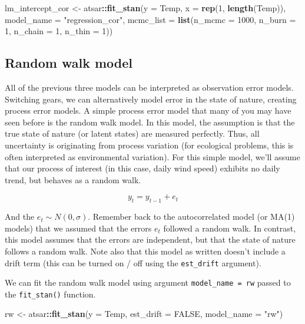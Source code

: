 \documentclass[
]{article}
\newenvironment{Shaded}{\begin{snugshade}}{\end{snugshade}}
\newcommand{\DataTypeTok}[1]{\textcolor[rgb]{0.13,0.29,0.53}{#1}}
\newcommand{\DecValTok}[1]{\textcolor[rgb]{0.00,0.00,0.81}{#1}}
\newcommand{\KeywordTok}[1]{\textcolor[rgb]{0.13,0.29,0.53}{\textbf{#1}}}
\newcommand{\NormalTok}[1]{#1}
\newcommand{\OperatorTok}[1]{\textcolor[rgb]{0.81,0.36,0.00}{\textbf{#1}}}
\newcommand{\OtherTok}[1]{\textcolor[rgb]{0.56,0.35,0.01}{#1}}
\newcommand{\StringTok}[1]{\textcolor[rgb]{0.31,0.60,0.02}{#1}}
\begin{document}
\begin{Shaded}
\begin{Highlighting}[]
\NormalTok{lm_intercept_cor <-}\StringTok{ }\NormalTok{atsar}\OperatorTok{::}\KeywordTok{fit_stan}\NormalTok{(}\DataTypeTok{y =}\NormalTok{ Temp, }\DataTypeTok{x =} \KeywordTok{rep}\NormalTok{(}\DecValTok{1}\NormalTok{, }\KeywordTok{length}\NormalTok{(Temp)), }
    \DataTypeTok{model_name =} \StringTok{"regression_cor"}\NormalTok{, }\DataTypeTok{mcmc_list =} \KeywordTok{list}\NormalTok{(}\DataTypeTok{n_mcmc =} \DecValTok{1000}\NormalTok{, }
        \DataTypeTok{n_burn =} \DecValTok{1}\NormalTok{, }\DataTypeTok{n_chain =} \DecValTok{1}\NormalTok{, }\DataTypeTok{n_thin =} \DecValTok{1}\NormalTok{))}
\end{Highlighting}
\end{Shaded}

\hypertarget{sec-stan-rw}{%
\subsection{Random walk model}\label{sec-stan-rw}}

All of the previous three models can be interpreted as observation error
models. Switching gears, we can alternatively model error in the state
of nature, creating process error models. A simple process error model
that many of you may have seen before is the random walk model. In this
model, the assumption is that the true state of nature (or latent
states) are measured perfectly. Thus, all uncertainty is originating
from process variation (for ecological problems, this is often
interpreted as environmental variation). For this simple model, we'll
assume that our process of interest (in this case, daily wind speed)
exhibits no daily trend, but behaves as a random walk.

\[y_t = y_{t-1} + e_{t}\]

And the \({e}_{t} \sim N(0, \sigma)\). Remember back to the
autocorrelated model (or MA(1) models) that we assumed that the errors
\(e_t\) followed a random walk. In contrast, this model assumes that the
errors are independent, but that the state of nature follows a random
walk. Note also that this model as written doesn't include a drift term
(this can be turned on / off using the \texttt{est\_drift} argument).

We can fit the random walk model using argument
\texttt{model\_name\ =\ \textquotesingle{}rw\textquotesingle{}} passed
to the \texttt{fit\_stan()} function.

\begin{Shaded}
\begin{Highlighting}[]
\NormalTok{rw <-}\StringTok{ }\NormalTok{atsar}\OperatorTok{::}\KeywordTok{fit_stan}\NormalTok{(}\DataTypeTok{y =}\NormalTok{ Temp, }\DataTypeTok{est_drift =} \OtherTok{FALSE}\NormalTok{, }\DataTypeTok{model_name =} \StringTok{"rw"}\NormalTok{)}
\end{Highlighting}
\end{Shaded}
\end{document}
